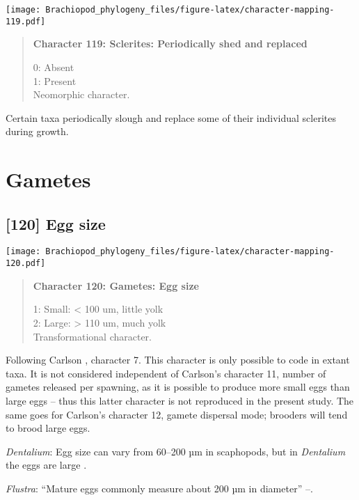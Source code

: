 \documentclass[openany]{book}
\theoremstyle{definition}
\theoremstyle{definition}
\theoremstyle{definition}
\theoremstyle{remark}
\begin{document}
\texttt{[image: Brachiopod\_phylogeny\_files/figure-latex/character-mapping-119.pdf]}

\begin{quote}
\textbf{Character 119: Sclerites: Periodically shed and replaced}

0: Absent\\
1: Present\\
Neomorphic character.
\end{quote}

Certain taxa periodically slough and replace some of their individual
sclerites during growth.

\section{Gametes}\label{gametes}

\subsection*{{[}120{]} Egg size}\label{egg-size}

\texttt{[image: Brachiopod\_phylogeny\_files/figure-latex/character-mapping-120.pdf]}

\begin{quote}
\textbf{Character 120: Gametes: Egg size}

1: Small: \textless{} 100 um, little yolk\\
2: Large: \textgreater{} 110 um, much yolk\\
Transformational character.
\end{quote}

Following Carlson \citeyearpar{Carlson1995Phylogeneticrelationships},
character 7. This character is only possible to code in extant taxa. It
is not considered independent of Carlson's character 11, number of
gametes released per spawning, as it is possible to produce more small
eggs than large eggs -- thus this latter character is not reproduced in
the present study. The same goes for Carlson's character 12, gamete
dispersal mode; brooders will tend to brood large eggs.

\hypertarget{Dentalium-coding-120}{}
\emph{Dentalium}: Egg size can vary from 60--200 µm in scaphopods, but
in \emph{Dentalium} the eggs are large \citep{DufresneDube1983}.

\hypertarget{Flustra-coding-120}{}
\emph{Flustra}: ``Mature eggs commonly measure about 200 µm in
diameter'' --.
\end{document}
